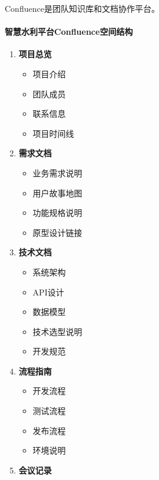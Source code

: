 Confluence是团队知识库和文档协作平台。

\paragraph{智慧水利平台Confluence空间结构}\label{ux667aux6167ux6c34ux5229ux5e73ux53f0confluenceux7a7aux95f4ux7ed3ux6784}

\begin{enumerate}
\def\labelenumi{\arabic{enumi}.}
\tightlist
\item
  \textbf{项目总览}

  \begin{itemize}
  \tightlist
  \item
    项目介绍
  \item
    团队成员
  \item
    联系信息
  \item
    项目时间线
  \end{itemize}
\item
  \textbf{需求文档}

  \begin{itemize}
  \tightlist
  \item
    业务需求说明
  \item
    用户故事地图
  \item
    功能规格说明
  \item
    原型设计链接
  \end{itemize}
\item
  \textbf{技术文档}

  \begin{itemize}
  \tightlist
  \item
    系统架构
  \item
    API设计
  \item
    数据模型
  \item
    技术选型说明
  \item
    开发规范
  \end{itemize}
\item
  \textbf{流程指南}

  \begin{itemize}
  \tightlist
  \item
    开发流程
  \item
    测试流程
  \item
    发布流程
  \item
    环境说明
  \end{itemize}
\item
  \textbf{会议记录}


\end{enumerate}

